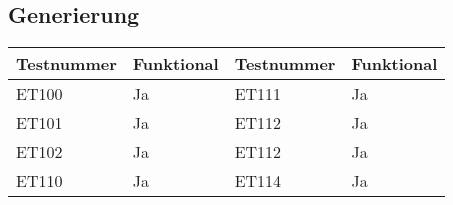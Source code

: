 \subsection{Generierung}

\begin{tabularx}{0.9\textwidth}{p{}|p{}||p{}|p{}}
    \textbf{Testnummer} & \textbf{Funktional} & \textbf{Testnummer} & \textbf{Funktional}\\
    \hline
    ET100	& Ja		& ET111		& Ja\\
    \hline
    ET101	& Ja		& ET112	    & Ja\\
    \hline
    ET102	& Ja		& ET112		& Ja\\
    \hline
    ET110	& Ja		& ET114	    & Ja\\
\end{tabularx}